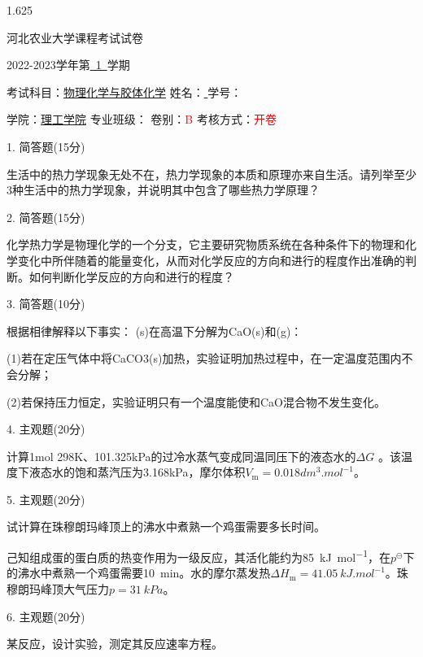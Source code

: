 \documentclass[12pt, b5paper]{article}
\newcommand*{\cred}{\textcolor{red}}
\begin{document}
\begin{spacing}{1.625}

\centerline{{\huge 河北农业大学课程考试试卷}}

\centerline{\large 2022-2023学年第\underline{\ 1\ }学期}

考试科目：\underline{物理化学与胶体化学} \quad 姓名：\underline{ \qquad \qquad} \quad 学号：\underline{ \qquad \qquad \qquad}

学院：\underline{理工学院} \quad 专业班级：\underline{\qquad \qquad \qquad \qquad} \quad 卷别：\cred{B} 考核方式：\cred{开卷}

\bigskip


1. 简答题(15分)

生活中的热力学现象无处不在，热力学现象的本质和原理亦来自生活。请列举至少3种生活中的热力学现象，并说明其中包含了哪些热力学原理？

\bigskip

\bigskip

2. 简答题(15分)

化学热力学是物理化学的一个分支，它主要研究物质系统在各种条件下的物理和化学变化中所伴随着的能量变化，从而对化学反应的方向和进行的程度作出准确的判断。如何判断化学反应的方向和进行的程度？

\bigskip

\bigskip

3. 简答题(10分)

根据相律解释以下事实：
(s)在高温下分解为CaO(s)和(g)：

(1)若在定压气体中将CaCO3(s)加热，实验证明加热过程中，在一定温度范围内不会分解；

(2)若保持压力恒定，实验证明只有一个温度能使和CaO混合物不发生变化。


\bigskip

\bigskip

4. 主观题(20分)

计算1mol 298K、101.325kPa的过冷水蒸气变成同温同压下的液态水的$\Delta G$ 。该温度下液态水的饱和蒸汽压为3.168kPa，摩尔体积$V_\mathrm{m} = 0.018 \si{dm^3.mol^{-1}}$。

\bigskip

\bigskip


5. 主观题(20分)

试计算在珠穆朗玛峰顶上的沸水中煮熟一个鸡蛋需要多长时间。

己知组成蛋的蛋白质的热变作用为一级反应，其活化能约为\SI{85}{kJ.mol^{-1}}，在$p^\ominus$下的沸水中煮熟一个鸡蛋需要\SI{10}{min}。水的摩尔蒸发热$\Delta H_\mathrm{m} = \SI{41.05}{kJ.mol^{-1}}$。珠穆朗玛峰顶大气压力$p=\SI{31}{kPa}$。

\bigskip

\bigskip

6. 主观题(20分)

某反应，设计实验，测定其反应速率方程。


\end{spacing}
\end{document}
